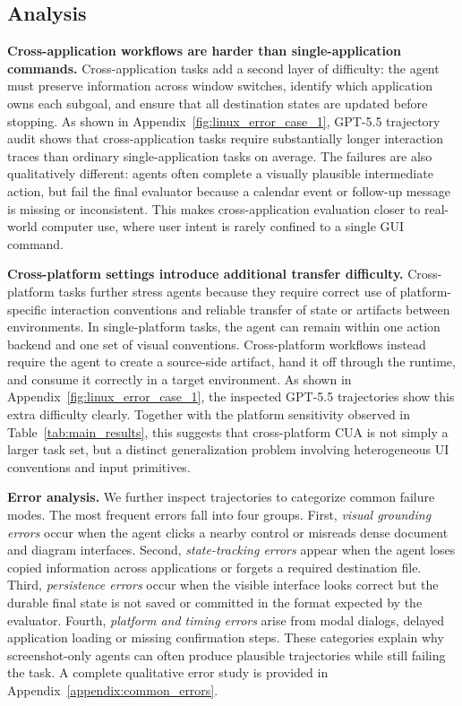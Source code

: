\subsection{Analysis}

\noindent
\textbf{Cross-application workflows are harder than single-application commands.}
Cross-application tasks add a second layer of difficulty: the agent must preserve information across window switches, identify which application owns each subgoal, and ensure that all destination states are updated before stopping. As shown in Appendix~\ref{fig:linux_error_case_1}, GPT-5.5 trajectory audit shows that cross-application tasks require substantially longer interaction traces than ordinary single-application tasks on average. The failures are also qualitatively different: agents often complete a visually plausible intermediate action, but fail the final evaluator because a calendar event or follow-up message is missing or inconsistent. This makes cross-application evaluation closer to real-world computer use, where user intent is rarely confined to a single GUI command.

\noindent
\textbf{Cross-platform settings introduce additional transfer difficulty.}
Cross-platform tasks further stress agents because they require correct use of platform-specific interaction conventions and reliable transfer of state or artifacts between environments. In single-platform tasks, the agent can remain within one action backend and one set of visual conventions. Cross-platform workflows instead require the agent to create a source-side artifact, hand it off through the runtime, and consume it correctly in a target environment.  As shown in Appendix~\ref{fig:linux_error_case_1}, the inspected GPT-5.5 trajectories show this extra difficulty clearly. Together with the platform sensitivity observed in Table~\ref{tab:main_results}, this suggests that cross-platform CUA is not simply a larger task set, but a distinct generalization problem involving heterogeneous UI conventions and input primitives.

\noindent
\textbf{Error analysis.}
We further inspect trajectories to categorize common failure modes. The most frequent errors fall into four groups. First, \emph{visual grounding errors} occur when the agent clicks a nearby control or misreads dense document and diagram interfaces. Second, \emph{state-tracking errors} appear when the agent loses copied information across applications or forgets a required destination file. Third, \emph{persistence errors} occur when the visible interface looks correct but the durable final state is not saved or committed in the format expected by the evaluator. Fourth, \emph{platform and timing errors} arise from modal dialogs, delayed application loading or missing confirmation steps. These categories explain why screenshot-only agents can often produce plausible trajectories while still failing the task. A complete qualitative error study is provided in Appendix~\ref{appendix:common_errors}.
